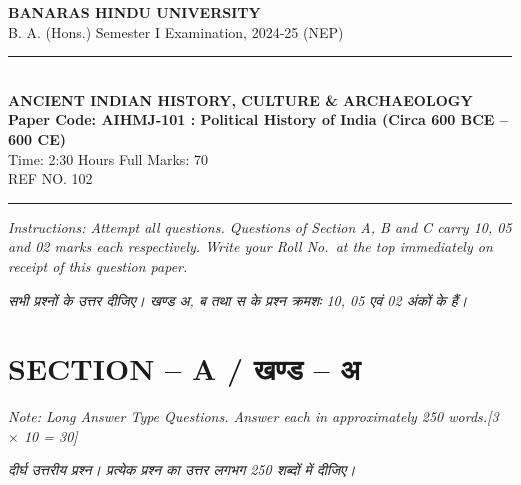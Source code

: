 \documentclass[11pt,a4paper]{article}
\newcommand{\pts}[1]{\hfill \textit{[#1]}}
\begin{document}
\begin{center}
  {\large\bfseries BANARAS HINDU UNIVERSITY}\\[2pt]
  {\normalsize B. A. (Hons.) Semester I Examination, 2024-25 (NEP)}\\[6pt]
  \rule{0.8\linewidth}{0.5pt}\\[6pt]
  {\large\bfseries ANCIENT INDIAN HISTORY, CULTURE \& ARCHAEOLOGY}\\[4pt]
  {\large\bfseries Paper Code: AIHMJ-101 : Political History of India (Circa 600 BCE -- 600 CE)}\\[4pt]
  {\normalsize Time: 2:30 Hours \hfill Full Marks: 70}\\[2pt]
  {\small REF NO. 102}
\end{center}
\rule{\linewidth}{0.4pt}
\smallskip

\noindent \textit{Instructions: Attempt all questions. Questions of Section A, B and C carry 10, 05 and 02 marks each respectively. Write your Roll No.\ at the top immediately on receipt of this question paper.}

\smallskip
\noindent \textit{सभी प्रश्नों के उत्तर दीजिए। खण्ड अ, ब तथा स के प्रश्न क्रमशः 10, 05 एवं 02 अंकों के हैं।}

\bigskip

\section*{SECTION -- A / खण्ड -- अ}
\noindent \textit{Note: Long Answer Type Questions. Answer each in approximately 250 words.}\pts{3 $\times$ 10 = 30}

\noindent \textit{दीर्घ उत्तरीय प्रश्न। प्रत्येक प्रश्न का उत्तर लगभग 250 शब्दों में दीजिए।}
\end{document}
